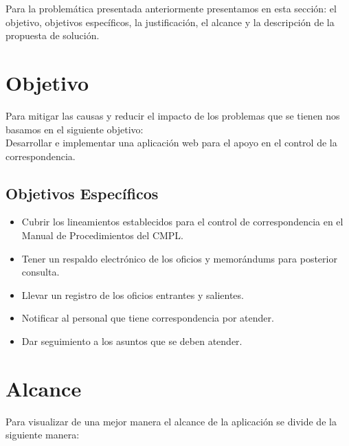 
Para la problemática presentada anteriormente presentamos en esta sección: el objetivo, objetivos específicos, la justificación, el alcance y la descripción de la propuesta de solución.\\

\section{Objetivo}

Para mitigar las causas y reducir el impacto de los problemas que se tienen nos basamos en el siguiente objetivo: \\

Desarrollar e implementar una aplicación web para el apoyo en el control de la correspondencia.\\

\subsection{Objetivos Específicos}

\begin{itemize}
	\item Cubrir los lineamientos establecidos para el control de correspondencia en el Manual de Procedimientos del CMPL.
	\item Tener un respaldo electrónico de los oficios y memorándums para posterior consulta.
	\item Llevar un registro de los oficios entrantes y salientes.
	\item Notificar al personal que tiene correspondencia por atender.
	\item Dar seguimiento a los asuntos que se deben atender.
\end{itemize}


\section{Alcance}

Para visualizar de una mejor manera el alcance de la aplicación se divide de la siguiente manera: \\


